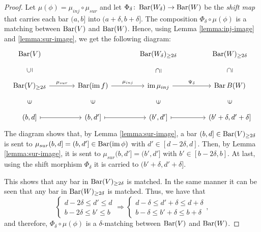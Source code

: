 \begin{proof}
    Let $\mu(\phi) = \mu_{inj} \circ \mu_{sur} $ and let $ \Phi_\delta \colon \operatorname{Bar}(W_\delta) \to \operatorname{Bar}(W) $ be the {\it shift map} that carries each bar $ (a, b] $ into $ (a + \delta, b +\delta ]$. The composition $ \Phi_\delta \circ \mu(\phi) $ is a matching between $ \operatorname{Bar}(V) $ and $ \operatorname{Bar}(W) $. Hence, using Lemma \ref{lemma:inj-image} and \ref{lemma:sur-image}, we get the following diagram:
    $$
    \begin{tikzcd}[column sep=large, row sep=large]
        \barc(V)
        &
        & \barc(W_\delta)_{\geq 2 \delta} 
        & \barc(W)_{\geq 2 \delta} \\
        \barc(V)_{\geq 2\delta} \arrow[r, "\mu_{sur}"] \arrow[u, phantom, "{\rotatebox{90}{$\subseteq$}}" description]
        & \barc(\im f) \arrow[r, "\mu_{inj}"]
        & \im \mu_{inj} \arrow[r, "\Psi_\delta"] \arrow[u, phantom, "{\rotatebox{90}{$\supseteq$}}" description]
        & \barc{B}(W) \arrow[u, phantom, "{\rotatebox{90}{$\supseteq$}}" description]\\
        (b, d] \arrow[r, mapsto] \arrow[u, phantom, "{\rotatebox{90}{$\in$}}"]
        & (b, d'] \arrow[r, mapsto] \arrow[u, phantom, "{\rotatebox{90}{$\in$}}"]
        & (b', d'] \arrow[r, mapsto] \arrow[u, phantom, "{\rotatebox{90}{$\in$}}"] 
        & (b' + \delta, d' + \delta] \arrow[u, phantom, "{\rotatebox{90}{$\in$}}"]
    \end{tikzcd}
    $$
    The diagram shows that, by Lemma \ref{lemma:sur-image}, a bar $ (b, d] \in \operatorname{Bar}(V)_{\geq 2\delta} $ is sent to $ \mu_{sur}(b, d] = (b, d'] \in \operatorname{Bar}(\operatorname{im} \phi) $ with $ d' \in [d - 2 \delta, d] $. Then, by Lemma \ref{lemma:sur-image}, it is sent to $ \mu_{sur}(b, d'] = (b', d'] $ with $ b' \in [b - 2 \delta, b] $. At last, using the shift morphism $ \Phi_\delta$ it is carried to $(b' + \delta, d' + \delta] $.

    This shows that any bar in $ \operatorname{Bar}(V)_{\geq 2\delta} $ is matched. In the same manner it can be seen that any bar in $ \operatorname{Bar}(W)_{\geq 2\delta} $ is matched. Thus, we have that
    $$
        \begin{cases}
            d - 2\delta \leq d' \leq d\\
            b - 2\delta \leq b' \leq b
        \end{cases}
        \Rightarrow
        \begin{cases}
            d - \delta \leq d' + \delta \leq d + \delta \\
            b - \delta \leq b' + \delta \leq b + \delta 
        \end{cases},
    $$
    and therefore, $ \Phi_\delta \circ \mu(\phi) $ is a $\delta$-matching between $ \operatorname{Bar}(V) $ and $ \operatorname{Bar}(W) $.
\end{proof}

